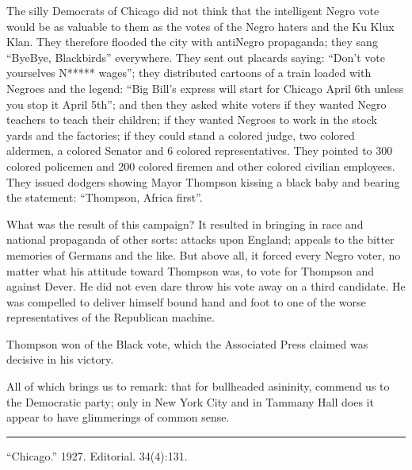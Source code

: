 \documentclass[letterpaper,10pt,english]{jupyterBook}
\begin{document}
\sphinxAtStartPar
The silly Democrats of Chicago did not think that the intelligent Negro vote would be as valuable to them as the votes of the Negro haters and the Ku Klux Klan. They therefore flooded the city with anti\sphinxhyphen{}Negro propaganda; they sang “Bye\sphinxhyphen{}Bye, Blackbirds” everywhere. They sent out placards saying: “Don’t vote yourselves N***** wages”; they distributed cartoons of a train loaded with Negroes and the legend: “Big Bill’s express will start for Chicago April 6th unless you stop it April 5th”; and then they asked white voters if they wanted Negro teachers to teach their children; if they wanted Negroes to work in the stock yards and the factories; if they could stand a colored judge, two colored aldermen, a colored Senator and 6 colored representatives. They pointed to 300 colored policemen and 200 colored firemen and other colored civilian employees. They issued dodgers showing Mayor Thompson kissing a black baby and bearing the statement: “Thompson, Africa first”.

\sphinxAtStartPar
What was the result of this campaign? It resulted in bringing in race and national propaganda of other sorts: attacks upon England; appeals to the bitter memories of Germans and the like. But above all, it forced every Negro voter, no matter what his attitude toward Thompson was, to vote for Thompson and against Dever. He did not even dare throw his vote away on a third candidate. He was compelled to deliver himself bound hand and foot to one of the worse representatives of the Republican machine.

\begin{sphinxShadowBox}
\sphinxstylesidebartitle{}

\sphinxAtStartPar
Thompson won  of the Black vote, which the Associated Press claimed was decisive in his victory.
\end{sphinxShadowBox}

\sphinxAtStartPar
All of which brings us to remark: that for bull\sphinxhyphen{}headed asininity, commend us to the Democratic party; only in New York City and in Tammany Hall does it appear to have glimmerings of common sense.


\bigskip\hrule\bigskip


\sphinxAtStartPar
{} “Chicago.” 1927. Editorial.  34(4):131.
\end{document}
